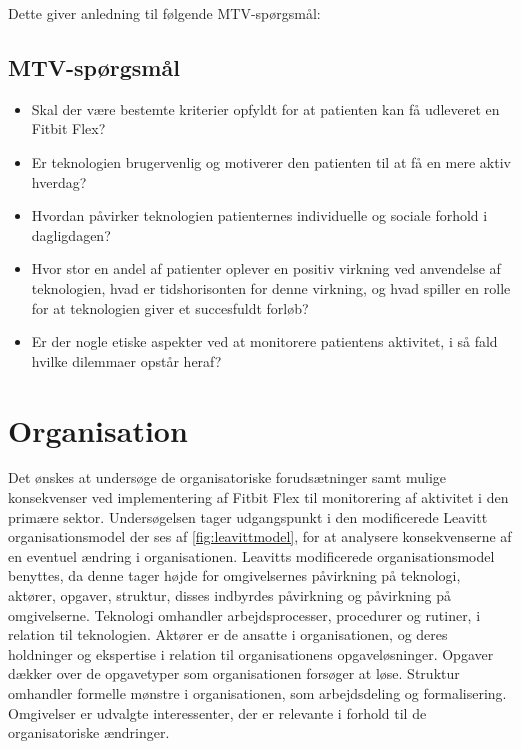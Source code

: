 \noindent
Dette giver anledning til følgende MTV-spørgsmål: 

\subsection{MTV-spørgsmål}
\begin{itemize}
\item Skal der være bestemte kriterier opfyldt for at patienten kan få udleveret en Fitbit Flex?
\item Er teknologien brugervenlig og motiverer den patienten til at få en mere aktiv hverdag?
\item Hvordan påvirker teknologien patienternes individuelle og sociale forhold i dagligdagen?
\item Hvor stor en andel af patienter oplever en positiv virkning ved anvendelse af teknologien, hvad er tidshorisonten for denne virkning, og hvad spiller en rolle for at teknologien giver et succesfuldt forløb?
\item Er der nogle etiske aspekter ved at monitorere patientens aktivitet, i så fald hvilke dilemmaer opstår heraf?
\end{itemize} 

\section{Organisation}\label{sec:metode_org}
Det ønskes at undersøge de organisatoriske forudsætninger samt mulige konsekvenser ved implementering af Fitbit Flex til monitorering af aktivitet i den primære sektor. Undersøgelsen tager udgangspunkt i den modificerede Leavitt organisationsmodel der ses af \autoref{fig:leavittmodel}, for at analysere konsekvenserne af en eventuel ændring i organisationen. Leavitts modificerede organisationsmodel benyttes, da denne tager højde for omgivelsernes påvirkning på teknologi, aktører, opgaver, struktur, disses indbyrdes påvirkning og påvirkning på omgivelserne. 
Teknologi omhandler arbejdsprocesser, procedurer og rutiner, i relation til teknologien.  
Aktører er de ansatte i organisationen, og deres holdninger og ekspertise i relation til organisationens opgaveløsninger. 
Opgaver dækker over de opgavetyper som organisationen forsøger at løse. 
Struktur omhandler formelle mønstre i organisationen, som arbejdsdeling og formalisering.  
Omgivelser er udvalgte interessenter, der er relevante i forhold til de organisatoriske ændringer. 

